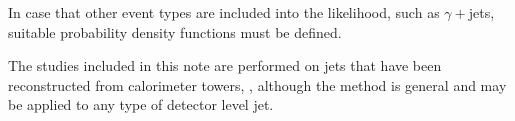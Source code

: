 In case that other event types are included into the likelihood, such as $\gamma+$jets, suitable probability density functions must be defined.

The studies included in this note are performed on jets that have been reconstructed from calorimeter towers, \textit{\calojets}, although the method is general and may be applied to any type of detector level jet.

